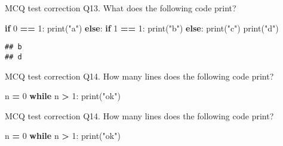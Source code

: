 \documentclass[
  8pt,
  ignorenonframetext,
]{beamer}
\newenvironment{Shaded}{\begin{snugshade}}{\end{snugshade}}
\newcommand{\BuiltInTok}[1]{#1}
\newcommand{\ControlFlowTok}[1]{\textcolor[rgb]{0.13,0.29,0.53}{\textbf{#1}}}
\newcommand{\DecValTok}[1]{\textcolor[rgb]{0.00,0.00,0.81}{#1}}
\newcommand{\NormalTok}[1]{#1}
\newcommand{\OperatorTok}[1]{\textcolor[rgb]{0.81,0.36,0.00}{\textbf{#1}}}
\newcommand{\StringTok}[1]{\textcolor[rgb]{0.31,0.60,0.02}{#1}}
\begin{document}
\begin{frame}[fragile]{MCQ test correction}
\protect\hypertarget{mcq-test-correction-25}{}
Q13. What does the following code print?

\begin{Shaded}
\begin{Highlighting}[]
\ControlFlowTok{if} \DecValTok{0} \OperatorTok{==} \DecValTok{1}\NormalTok{:}
    \BuiltInTok{print}\NormalTok{(}\StringTok{"a"}\NormalTok{)}
\ControlFlowTok{else}\NormalTok{:}
    \ControlFlowTok{if} \DecValTok{1} \OperatorTok{==} \DecValTok{1}\NormalTok{:}
        \BuiltInTok{print}\NormalTok{(}\StringTok{"b"}\NormalTok{)}
    \ControlFlowTok{else}\NormalTok{:}
        \BuiltInTok{print}\NormalTok{(}\StringTok{"c"}\NormalTok{)}
    \BuiltInTok{print}\NormalTok{(}\StringTok{"d"}\NormalTok{)}
\end{Highlighting}
\end{Shaded}

\begin{verbatim}
## b
## d
\end{verbatim}
\end{frame}

\begin{frame}[fragile]{MCQ test correction}
\protect\hypertarget{mcq-test-correction-26}{}
Q14. How many lines does the following code print?

\begin{Shaded}
\begin{Highlighting}[]
\NormalTok{n }\OperatorTok{=} \DecValTok{0}
\ControlFlowTok{while}\NormalTok{ n }\OperatorTok{\textgreater{}} \DecValTok{1}\NormalTok{:}
    \BuiltInTok{print}\NormalTok{(}\StringTok{"ok"}\NormalTok{)}
\end{Highlighting}
\end{Shaded}
\end{frame}

\begin{frame}[fragile]{MCQ test correction}
\protect\hypertarget{mcq-test-correction-27}{}
Q14. How many lines does the following code print?

\begin{Shaded}
\begin{Highlighting}[]
\NormalTok{n }\OperatorTok{=} \DecValTok{0}
\ControlFlowTok{while}\NormalTok{ n }\OperatorTok{\textgreater{}} \DecValTok{1}\NormalTok{:}
    \BuiltInTok{print}\NormalTok{(}\StringTok{"ok"}\NormalTok{)}
\end{Highlighting}
\end{Shaded}
\end{frame}
\end{document}
